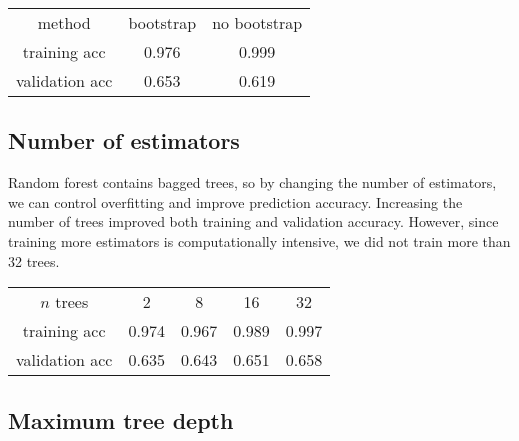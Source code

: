 \documentclass{article}
\begin{document}
\begin{multicols}{2}
%
\begin{center}
    \begin{tabular}{c| c c}
        method & bootstrap & no bootstrap \\
        training acc
        		& 0.976 & 0.999 \\
        validation acc
        		& 0.653 & 0.619
    \end{tabular}
\end{center}

\subsection{Number of estimators}

Random forest contains bagged trees,
so by changing the number of estimators,
we can control overfitting and improve prediction accuracy.
Increasing the number of trees
improved both training and validation accuracy.
However, since training more estimators
is computationally intensive,
we did not train more than 32 trees.
%
%
%
\begin{center}
    \begin{tabular}{c|c c c c}
        $n$ trees
        		& 2 & 8 & 16 & 32 \\
        training acc
        		& 0.974 & 0.967 & 0.989 & 0.997\\
        validation acc
        		& 0.635 & 0.643 & 0.651 & 0.658
    \end{tabular}
\end{center}

\subsection{Maximum tree depth}


\end{multicols}
\end{document}
